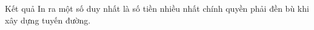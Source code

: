 Kết quả
In ra một số duy nhất là số tiền nhiều nhất chính quyền phải đền bù khi xây dựng tuyến đường.